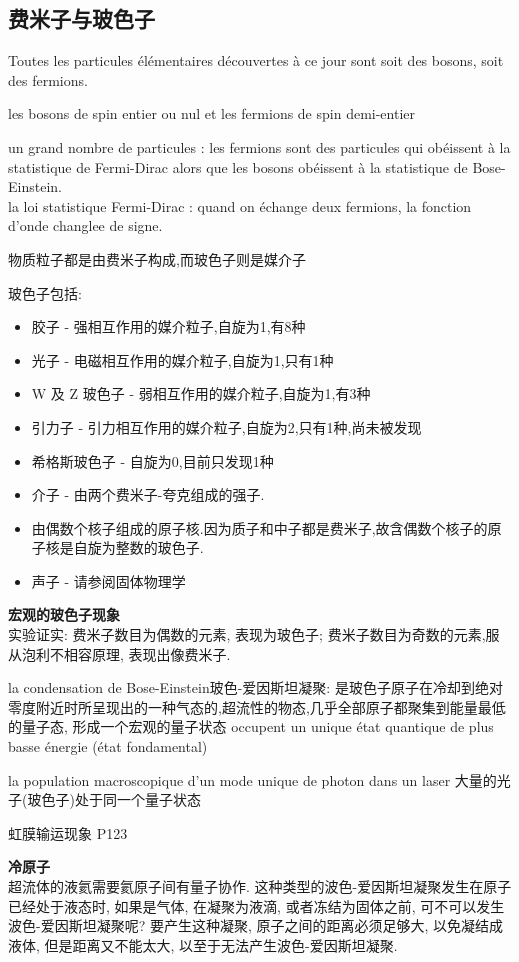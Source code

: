 \documentclass{article}
\begin{document}
\subsection{费米子与玻色子}
Toutes les particules \'el\'ementaires d\'ecouvertes \`a ce jour sont soit des bosons, soit des fermions.\par

les bosons de spin entier ou nul et les fermions de spin demi-entier

un grand nombre de particules : les fermions sont des particules qui ob\'eissent \`a la statistique de Fermi-Dirac alors que les bosons ob\'eissent \`a la statistique de Bose-Einstein.\\
la loi statistique Fermi-Dirac : quand on \'echange deux fermions, la fonction d'onde changlee de signe.

物质粒子都是由费米子构成,而玻色子则是媒介子

玻色子包括:
\begin{itemize}
\item 胶子 - 强相互作用的媒介粒子,自旋为1,有8种
\item 光子 - 电磁相互作用的媒介粒子,自旋为1,只有1种
\item W 及 Z 玻色子 - 弱相互作用的媒介粒子,自旋为1,有3种
\item 引力子 - 引力相互作用的媒介粒子,自旋为2,只有1种,尚未被发现
\item 希格斯玻色子 - 自旋为0,目前只发现1种
\item 介子 - 由两个费米子-夸克组成的强子.
\item 由偶数个核子组成的原子核.因为质子和中子都是费米子,故含偶数个核子的原子核是自旋为整数的玻色子.
\item 声子 - 请参阅固体物理学
\end{itemize}

\textbf{宏观的玻色子现象}\\
实验证实: 费米子数目为偶数的元素, 表现为玻色子; 费米子数目为奇数的元素,服从泡利不相容原理, 表现出像费米子.

la condensation de Bose-Einstein玻色-爱因斯坦凝聚: 是玻色子原子在冷却到绝对零度附近时所呈现出的一种气态的,超流性的物态,几乎全部原子都聚集到能量最低的量子态,
形成一个宏观的量子状态  occupent un unique \'etat quantique de plus basse \'energie (\'etat fondamental)

la population macroscopique d'un mode unique de photon dans un laser
大量的光子(玻色子)处于同一个量子状态

虹膜输运现象 P123

\textbf{冷原子}\\
超流体的液氦需要氦原子间有量子协作. 这种类型的波色-爱因斯坦凝聚发生在原子已经处于液态时, 如果是气体, 在凝聚为液滴, 或者冻结为固体之前,
可不可以发生波色-爱因斯坦凝聚呢? 要产生这种凝聚, 原子之间的距离必须足够大, 以免凝结成液体, 但是距离又不能太大, 以至于无法产生波色-爱因斯坦凝聚.
\end{document}

